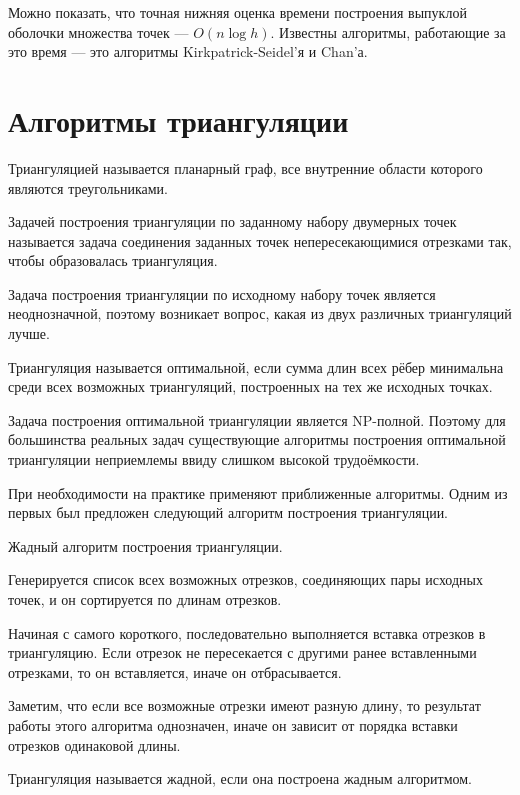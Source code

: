 Можно показать, что точная нижняя оценка времени построения выпуклой
оболочки множества точек --- $O(n\log h)$. Известны алгоритмы,
работающие за это время --- это алгоритмы Kirkpatrick-Seidel'я и Chan'а.

\section{Алгоритмы триангуляции}
\begin{define}
  Триангуляцией называется планарный граф, все внутренние области
  которого являются треугольниками.
\end{define}
\begin{define}
  Задачей построения триангуляции по заданному набору двумерных точек
  называется задача соединения заданных точек непересекающимися
  отрезками так, чтобы образовалась триангуляция.
\end{define}

Задача построения триангуляции по исходному набору точек является
неоднозначной, поэтому возникает вопрос, какая из двух различных
триангуляций лучше.

\begin{define}
  Триангуляция называется оптимальной, если сумма длин всех рёбер
  минимальна среди всех возможных триангуляций, построенных на тех
  же исходных точках.
\end{define}

Задача построения оптимальной триангуляции является NP-полной.
Поэтому для большинства реальных задач
существующие алгоритмы построения оптимальной триангуляции
неприемлемы ввиду слишком высокой трудоёмкости.

При  необходимости  на практике применяют приближенные алгоритмы.
Одним  из  первых был  предложен  следующий  алгоритм  построения
триангуляции.
\begin{algorithm}{Жадный алгоритм построения триангуляции.}
\item Генерируется список всех возможных отрезков, соединяющих пары
  исходных точек, и он сортируется по длинам отрезков.
\item Начиная с самого короткого, последовательно выполняется вставка
  отрезков в триангуляцию. Если отрезок не пересекается с другими
  ранее вставленными отрезками, то он вставляется, иначе он
  отбрасывается.
\end{algorithm}

Заметим, что если все возможные отрезки имеют разную длину, то
результат работы этого алгоритма однозначен, иначе он зависит от
порядка вставки отрезков одинаковой длины.
\begin{define}
  Триангуляция называется жадной, если она построена жадным
  алгоритмом.
\end{define}

